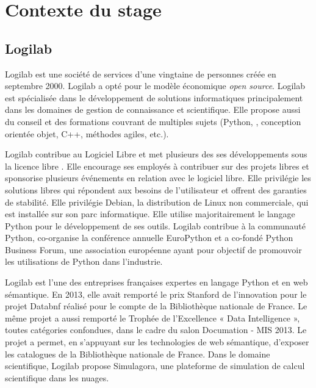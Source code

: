 
\chapter{Contexte du stage} 
\section{Logilab} 
Logilab est une société de services d'une vingtaine de personnes créée en 
septembre 2000. Logilab a opté pour le modèle économique \textit{open source}. 
Logilab est spécialisée dans le développement de solutions informatiques 
principalement dans les domaines de gestion de connaissance et scientifique. 
Elle propose aussi du conseil et des formations couvrant de multiples sujets 
(Python, , conception orientée objet, C++, méthodes agiles, 
etc.).

Logilab contribue au Logiciel Libre et met plusieurs des ses développements
sous la licence libre . Elle encourage ses employés à
contribuer sur des projets libres et sponsorise plusieurs événements en
relation avec le logiciel libre. Elle privilégie les solutions libres qui
répondent aux besoins de l'utilisateur et offrent des garanties de stabilité.
Elle privilégie Debian, la distribution de Linux non commerciale, qui est
installée sur son parc informatique. Elle utilise majoritairement le langage
Python pour le développement de ses outils. Logilab contribue à la communauté
Python, co-organise la conférence annuelle EuroPython et a co-fondé Python
Business Forum, une association européenne ayant pour objectif de promouvoir
les utilisations de Python dans l'industrie.

Logilab est l'une des entreprises françaises expertes en langage Python et en
web sémantique. En 2013, elle avait remporté le prix Stanford de l'innovation
pour le projet Databnf réalisé pour le compte de la Bibliothèque nationale de
France. Le même projet a aussi remporté le Trophée de l'Excellence « Data
Intelligence », toutes catégories confondues, dans le cadre du salon Documation
- MIS 2013\cite{dta}. Le projet a permet, en s’appuyant sur les technologies de
web sémantique, d'exposer les catalogues de la Bibliothèque nationale de France. 
Dans le domaine scientifique, Logilab propose Simulagora, une plateforme de 
simulation de calcul scientifique dans les nuages.

